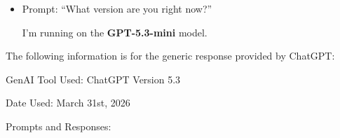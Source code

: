 \documentclass[
  letterpaper,
  DIV=11,
  numbers=noendperiod]{scrartcl}
\begin{document}
\begin{itemize}
\begin{itemize}
    \textbf{📖 Step 10: Long Description}

    This plot displays the average calcium levels of women over four
    years in a study comparing a control (null) group and an
    experimental treatment group. The x-axis represents time in years (0
    through 3), and the y-axis shows calcium levels. Each group is
    represented by a distinct colored line with points marking yearly
    averages. The experimental group consistently shows slightly higher
    calcium levels than the control group, suggesting a potential
    positive effect of the treatment over time.

    \textbf{⚠️ One Small Critique of Your Original Plan}

    You said:

    ``Each case is a woman''

    That's \textbf{true initially}, but after tidying:

    👉 Each case becomes \textbf{one observation per woman per year}

    That distinction matters in stats + visualization.''
  \item
    Prompt: ``What version are you right now?''

    I'm running on the \textbf{GPT-5.3-mini} model.
  \end{itemize}
\end{itemize}

The following information is for the generic response provided by
ChatGPT:

GenAI Tool Used: ChatGPT Version 5.3

Date Used: March 31st, 2026

Prompts and Responses:
\end{document}

